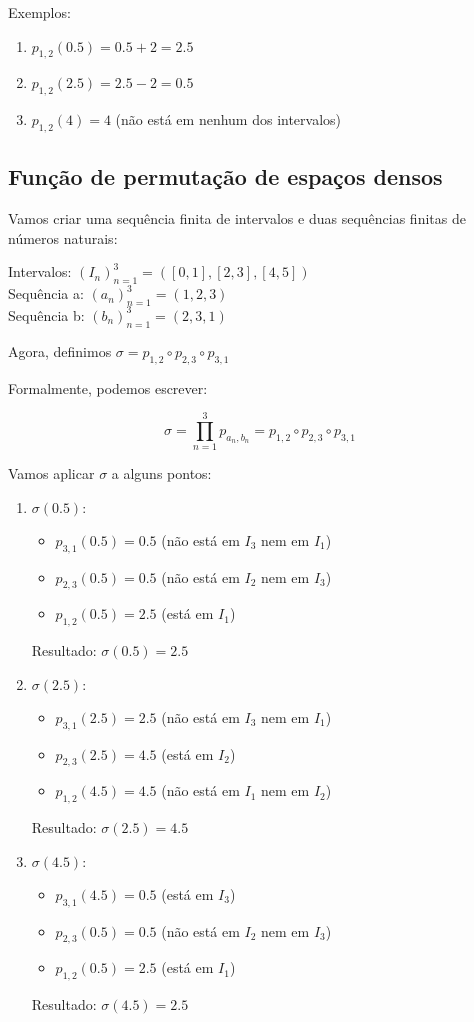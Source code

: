 \documentclass[12pt,a4paper]{article}
\begin{document}
Exemplos:
\begin{enumerate}
\item $p_{1,2}(0.5) = 0.5 + 2 = 2.5$
\item $p_{1,2}(2.5) = 2.5 - 2 = 0.5$
\item $p_{1,2}(4) = 4$ (não está em nenhum dos intervalos)
\end{enumerate}

\subsection{Função de permutação de espaços densos}

Vamos criar uma sequência finita de intervalos e duas sequências finitas de números naturais:

Intervalos: $(I_n)_{n=1}^3 = ([0, 1], [2, 3], [4, 5])$\\
Sequência a: $(a_n)_{n=1}^3 = (1, 2, 3)$\\
Sequência b: $(b_n)_{n=1}^3 = (2, 3, 1)$

Agora, definimos $\sigma = p_{1,2} \circ p_{2,3} \circ p_{3,1}$

Formalmente, podemos escrever:

\begin{equation}
\sigma = \prod_{n=1}^{3} p_{a_n,b_n} = p_{1,2} \circ p_{2,3} \circ p_{3,1}
\end{equation}

Vamos aplicar $\sigma$ a alguns pontos:

\begin{enumerate}
\item $\sigma(0.5):$
   \begin{itemize}
   \item $p_{3,1}(0.5) = 0.5$ (não está em $I_3$ nem em $I_1$)
   \item $p_{2,3}(0.5) = 0.5$ (não está em $I_2$ nem em $I_3$)
   \item $p_{1,2}(0.5) = 2.5$ (está em $I_1$)
   \end{itemize}
   Resultado: $\sigma(0.5) = 2.5$

\item $\sigma(2.5):$
   \begin{itemize}
   \item $p_{3,1}(2.5) = 2.5$ (não está em $I_3$ nem em $I_1$)
   \item $p_{2,3}(2.5) = 4.5$ (está em $I_2$)
   \item $p_{1,2}(4.5) = 4.5$ (não está em $I_1$ nem em $I_2$)
   \end{itemize}
   Resultado: $\sigma(2.5) = 4.5$

\item $\sigma(4.5):$
   \begin{itemize}
   \item $p_{3,1}(4.5) = 0.5$ (está em $I_3$)
   \item $p_{2,3}(0.5) = 0.5$ (não está em $I_2$ nem em $I_3$)
   \item $p_{1,2}(0.5) = 2.5$ (está em $I_1$)
   \end{itemize}
   Resultado: $\sigma(4.5) = 2.5$
\end{enumerate}
\end{document}
